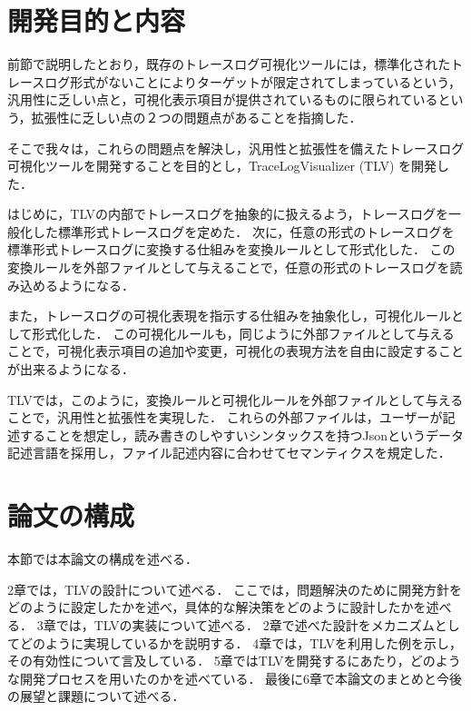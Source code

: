 \section{開発目的と内容}

前節で説明したとおり，既存のトレースログ可視化ツールには，標準化されたトレースログ形式がないことによりターゲットが限定されてしまっているという，汎用性に乏しい点と，可視化表示項目が提供されているものに限られているという，拡張性に乏しい点の２つの問題点があることを指摘した．

そこで我々は，これらの問題点を解決し，汎用性と拡張性を備えたトレースログ可視化ツールを開発することを目的とし，TraceLogVisualizer (TLV) を開発した．

はじめに，TLVの内部でトレースログを抽象的に扱えるよう，トレースログを一般化した標準形式トレースログを定めた．
次に，任意の形式のトレースログを標準形式トレースログに変換する仕組みを変換ルールとして形式化した．
この変換ルールを外部ファイルとして与えることで，任意の形式のトレースログを読み込めるようになる．

また，トレースログの可視化表現を指示する仕組みを抽象化し，可視化ルールとして形式化した．
この可視化ルールも，同じように外部ファイルとして与えることで，可視化表示項目の追加や変更，可視化の表現方法を自由に設定することが出来るようになる．

TLVでは，このように，変換ルールと可視化ルールを外部ファイルとして与えることで，汎用性と拡張性を実現した．
これらの外部ファイルは，ユーザーが記述することを想定し，読み書きのしやすいシンタックスを持つJsonというデータ記述言語を採用し，ファイル記述内容に合わせてセマンティクスを規定した．


\section{論文の構成}
本節では本論文の構成を述べる．

2章では，TLVの設計について述べる．
ここでは，問題解決のために開発方針をどのように設定したかを述べ，具体的な解決策をどのように設計したかを述べる．
3章では，TLVの実装について述べる．
2章で述べた設計をメカニズムとしてどのように実現しているかを説明する．
4章では，TLVを利用した例を示し，その有効性について言及している．
5章ではTLVを開発するにあたり，どのような開発プロセスを用いたのかを述べている．
最後に6章で本論文のまとめと今後の展望と課題について述べる．